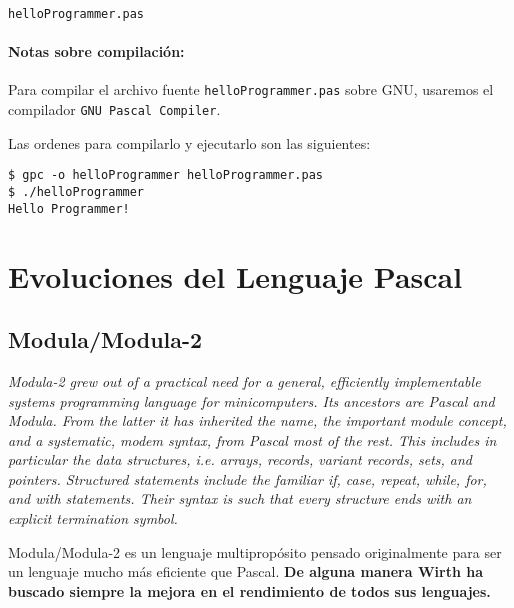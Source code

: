\prog \texttt{helloProgrammer.pas}



\paragraph*{Notas sobre compilación:} Para compilar el archivo fuente
\texttt{helloProgrammer.pas} sobre GNU, usaremos el compilador \texttt{GNU
Pascal
Compiler}. 

Las ordenes para compilarlo y ejecutarlo son las siguientes:

\begin{verbatim}
$ gpc -o helloProgrammer helloProgrammer.pas 
$ ./helloProgrammer 
Hello Programmer!
\end{verbatim}


\section{Evoluciones del Lenguaje Pascal}

\subsection{Modula/Modula-2}

\textit{Modula-2 grew out of a practical need for a general, efficiently
implementable
systems programming language for minicomputers. Its ancestors are Pascal and
Modula. From the latter it has inherited the name, the important module concept,
and a systematic, modem syntax, from Pascal most of the rest. This includes in
particular the data structures, i.e. arrays, records, variant records, sets, and
pointers. Structured statements include the familiar if, case, repeat, while,
for, and with statements. Their syntax is such that every structure ends with an
explicit termination symbol.} \cite{article/modula/modula2}

Modula/Modula-2 es un lenguaje multipropósito pensado originalmente para ser un
lenguaje mucho más eficiente que Pascal. \textbf{De alguna manera Wirth ha buscado
siempre la mejora en el rendimiento de todos sus lenguajes.}

